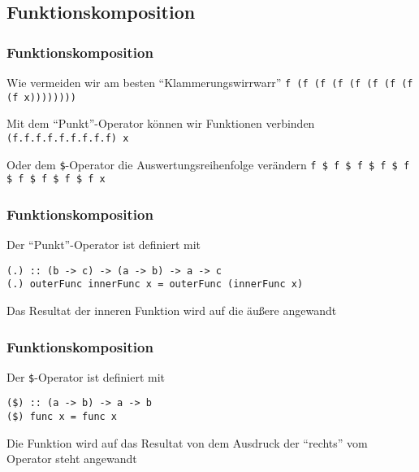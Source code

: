 \documentclass[fleqn,11pt,aspectratio=43]{beamer}
\begin{document}
\subsection{Funktionskomposition}
\begin{frame}[fragile]
\frametitle{Funktionskomposition}
\begin{block}{Wie vermeiden wir am besten "`Klammerungswirrwarr"'}
\lstinline|f (f (f (f (f (f (f (f (f x))))))))|
\end{block}
\pause
\begin{block}{Mit dem "`Punkt"'-Operator können wir Funktionen verbinden}
\lstinline|(f.f.f.f.f.f.f.f.f) x|
\end{block}
\pause
\begin{block}{Oder dem \lstinline|$|-Operator die Auswertungsreihenfolge verändern}
\lstinline|f $ f $ f $ f $ f $ f $ f $ f $ f x|
\end{block}
\end{frame}

\begin{frame}[fragile]
\frametitle{Funktionskomposition}
\begin{block}{Der "`Punkt"'-Operator ist definiert mit}
\begin{lstlisting}
(.) :: (b -> c) -> (a -> b) -> a -> c
(.) outerFunc innerFunc x = outerFunc (innerFunc x)
\end{lstlisting}
Das Resultat der inneren Funktion wird auf die äußere angewandt
\end{block}
\end{frame}

\begin{frame}[fragile]
\frametitle{Funktionskomposition}
\begin{block}{Der \lstinline|$|-Operator ist definiert mit}
\begin{lstlisting}
($) :: (a -> b) -> a -> b
($) func x = func x
\end{lstlisting}
Die Funktion wird auf das Resultat von dem Ausdruck der "`rechts"' vom Operator steht angewandt
\end{block}
\end{frame}
\end{document}
